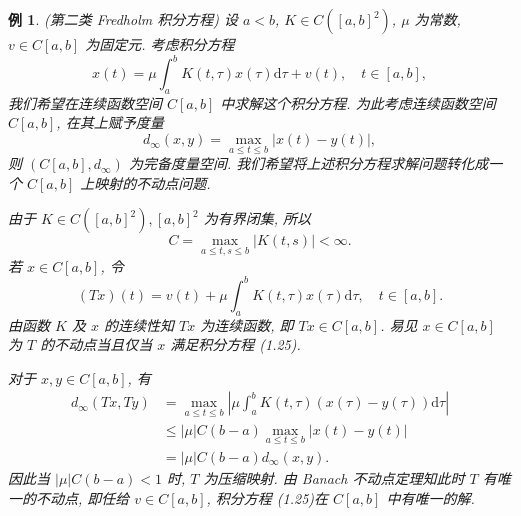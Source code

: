 \documentclass[openany]{ctexbook}
\theoremstyle{kaiti}
\theoremstyle{normal}
\newtheorem{example}{例}[section]
\begin{document}
\begin{example}
(第二类 Fredholm 积分方程) 设 $a<b$, $K \in C\left([a, b]^2\right)$, $\mu$ 为常数, $v \in C[a, b]$ 为固定元. 考虑积分方程
\begin{equation}
  x(t)=\mu \int_{a}^{b} K(t, \tau) x(\tau) \mathrm{d} \tau+v(t), \quad t \in[a, b],
\end{equation}
我们希望在连续函数空间 $C[a, b]$ 中求解这个积分方程. 为此考虑连续函数空间 $C[a, b]$, 在其上赋予度量
$$
d_{\infty}(x, y)=\max_{a \leqslant t \leqslant b}|x(t)-y(t)|,
$$
则 $\left(C[a, b], d_{\infty}\right)$ 为完备度量空间. 我们希望将上述积分方程求解问题转化成一个 $C[a, b]$ 上映射的不动点问题.

由于 $K \in C\left([a, b]^2\right),[a, b]^2$ 为有界闭集, 所以
$$
C=\max_{a \leqslant t, s \leqslant b}|K(t, s)|<\infty.
$$
若 $x \in C[a, b]$, 令
$$
(T x)(t)=v(t)+\mu \int_{a}^{b} K(t, \tau) x(\tau) \mathrm{d} \tau, \quad t \in[a, b].
$$
由函数 $K$ 及 $x$ 的连续性知 $T x$ 为连续函数, 即 $T x \in C[a, b]$. 易见 $x \in C[a, b]$ 为 $T$ 的不动点当且仅当 $x$ 满足积分方程 (1.25).

对于 $x, y \in C[a, b]$, 有
$$
\begin{aligned}
d_{\infty}(T x, T y) &=\max_{a \leqslant t \leqslant b}\left|\mu \int_{a}^{b} K(t, \tau)(x(\tau)-y(\tau)) \mathrm{d} \tau\right| \\
& \leqslant|\mu| C(b-a) \max_{a \leqslant t \leqslant b}|x(t)-y(t)| \\
&=|\mu| C(b-a) d_{\infty}(x, y).
\end{aligned}
$$
因此当 $|\mu| C(b-a)<1$ 时, $T$ 为压缩映射. 由 Banach 不动点定理知此时 $T$ 有唯一的不动点, 即任给 $v \in C[a, b]$, 积分方程 (1.25)在 $C[a, b]$ 中有唯一的解.
\end{example}
\end{document}
